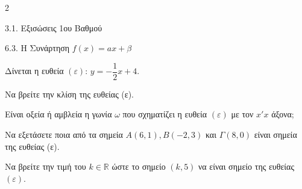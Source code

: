 \begin{ylh}{2}
    \item 3.1. Εξισώσεις 1ου Βαθμού
    \item 6.3. Η Συνάρτηση $f(x)=ax+\beta$
\end{ylh}
Δίνεται η ευθεία $(\varepsilon)$: $y = -\dfrac{1}{2}x + 4$.

\begin{alist}
\item
\begin{rlist}
\item Να βρείτε την κλίση της ευθείας (ε).
\item Είναι οξεία ή αμβλεία η γωνία $\omega$ που σχηματίζει η ευθεία $(\varepsilon)$ με τον $x'x$ άξονα;
\end{rlist}
\item Να εξετάσετε ποια από τα σημεία $A(6, 1), B(-2, 3)$ και $\varGamma(8, 0)$ είναι σημεία της ευθείας (ε).

\item Να βρείτε την τιμή του $k \in \mathbb{R}$ ώστε το σημείο $(k, 5)$ να είναι σημείο της ευθείας $(\varepsilon)$.
\end{alist}

